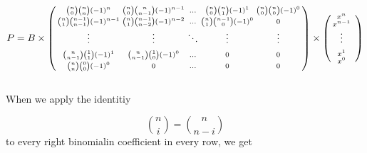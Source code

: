 \begin{gather*}
    P=B \times
    \begin{psmallmatrix}
        {n \choose 0}{n \choose n}    (-1)^{n}   & {n \choose 0}{n \choose n-1}  (-1)^{n-1} & \hdots & {n \choose 0}{n \choose 1}  (-1)^{1} & {n \choose 0}{n \choose 0}(-1)^{0} \\
        {n \choose 1}{n-1 \choose n-1}(-1)^{n-1} & {n \choose 1}{n-1 \choose n-2}(-1)^{n-2} & \hdots & {n \choose 1}{n-1 \choose 0}(-1)^{0} & 0                                  \\
        \vdots                                   & \vdots                                   & \ddots & \vdots                               & \vdots                             \\
        & \\
        {n \choose n-1}{1 \choose 1}  (-1)^{1}   & {n \choose n-1}{1 \choose 0}  (-1)^{0}   & \hdots & 0                                    & 0                                  \\
        {n \choose n}  {0 \choose 0}  (-1)^{0}   & 0                                        & \hdots & 0                                    & 0                                  \\
    \end{psmallmatrix}
    \times
    \begin{psmallmatrix}
        x^{n}   \\
        x^{n-1} \\
        \vdots  \\
        & \\
        x^{1}   \\
        x^{0}   \\
    \end{psmallmatrix}
\end{gather*}
\\
When we apply the identitiy

\begin{equation*}
    {n \choose i} = {n \choose n-i}
\end{equation*}
to every right binomialin coefficient in every row, we get

